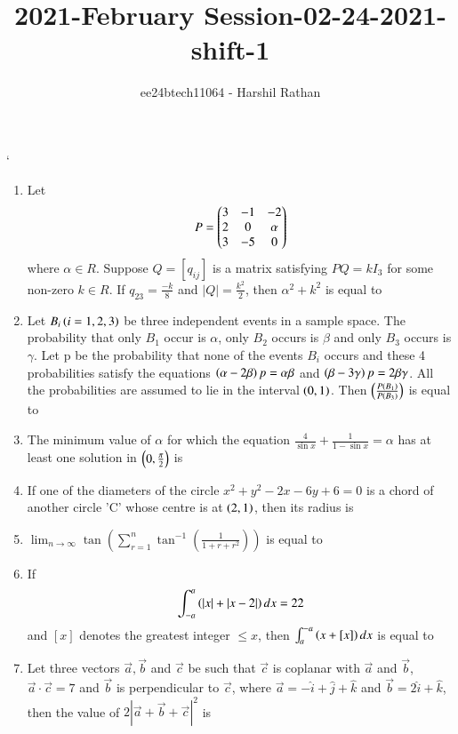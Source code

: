 \documentclass[journal,12pt,twocolumn]{IEEEtran}
\theoremstyle{remark}
\begin{document}

\vspace{3cm}

\title{2021-February Session-02-24-2021-shift-1}
\author{ee24btech11064 - Harshil Rathan}
\maketitle
\newpage
\bigskip

\renewcommand{\thefigure}{\theenumi}
`\renewcommand{\thetable}{\theenumi}
\begin{enumerate}
\item Let 
\begin{align*}
    P=\begin{pmatrix}3 & -1 & -2 \\ 2 & 0 & \alpha \\ 3 &-5 &0\end{pmatrix}
\end{align*}
where $\alpha \in R$. Suppose $Q=[q_{ij}]$ is a matrix satisfying $PQ=kI_3$ for some non-zero $k\in R$. If $q_{23}=\frac{-k}{8}$ and $|Q|=\frac{k^2}{2}$, then $\alpha^2+k^2$ is equal to 
\bigskip
\item Let $B_i \left(i=1,2,3\right)$ be three independent events in a sample space. The probability that only $B_1$ occur is $\alpha$, only $B_2$ occurs is $\beta$ and only $B_3$ occurs is $\gamma$. Let p be the probability that none of the events $B_i$ occurs and these 4 probabilities satisfy the equations $\left(\alpha-2\beta\right)p=\alpha\beta$ and $\left(\beta-3\gamma\right)p=2\beta\gamma$. All the probabilities are assumed to lie in the interval $\left(0,1\right)$. Then $\left(\frac{P\left(B_1\right)}{P\left(B_3\right)}\right)$ is equal to 
\bigskip
\item The minimum value of $\alpha$ for which the equation $\frac{4}{\sin{x}}+\frac{1}{1-\sin{x}}=\alpha$ has at least one solution in $\left(0,\frac{\pi}{2}\right)$ is 
\bigskip
\item If one of the diameters of the circle $x^2+y^2-2x-6y+6=0$ is a chord of another circle 'C' whose centre is at $\left(2,1\right)$, then its radius is 
\bigskip
\item $\lim_{n \to \infty} \tan \left( \sum_{r=1}^{n} \tan^{-1} \left( \frac{1}{1 + r + r^2} \right) \right)$ is equal to 
\bigskip
\item If 
\begin{align*}
    \int_{-a}^{a} \left(|x| + |x - 2|\right)dx = 22
\end{align*}
and $[x]$ denotes the greatest integer $\leq x$, then $\int_{a}^{-a} \left(x+[x]\right)dx$ is equal to 
\bigskip
\item Let three vectors $\vec{a},\vec{b}$ and $\vec{c}$ be such that $\vec{c}$ is coplanar with $\vec{a}$ and $\vec{b}$, $\vec{a}\cdot\vec{c}=7$ and $\vec{b}$ is perpendicular to $\vec{c}$, where $\vec{a}=-\hat{i}+\hat{j}+\hat{k}$ and $\vec{b}=2\hat{i}+\hat{k}$, then the value of $2|\vec{a}+\vec{b}+\vec{c}|^2$ is 

\end{enumerate}
\end{document}
